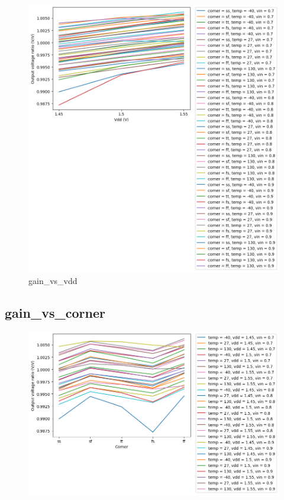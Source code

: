\documentclass[
  a4paper,
  DIV=11,
  numbers=noendperiod]{scrartcl}
\begin{document}
\begin{tcolorbox}
\begin{figure}[H]
{\centering \includegraphics{./cace/_docs/ota-5t/schematic/gain_vs_vdd.png}

}

\caption{gain\_vs\_vdd}

\end{figure}%

\subsection{gain\_vs\_corner}\label{gain_vs_corner}

\begin{figure}[H]

{\centering \includegraphics{./cace/_docs/ota-5t/schematic/gain_vs_corner.png}

}
\end{figure}
\end{tcolorbox}
\end{document}
